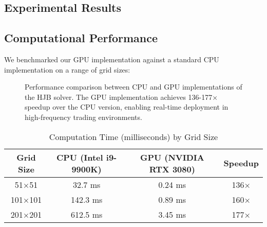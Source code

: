 \documentclass[onecolumn,ieee]{arithmaxresearch}
\begin{document}
\begin{onecolumn}
\section{Experimental Results}

\subsection{Computational Performance}

We benchmarked our GPU implementation against a standard CPU implementation on a range of grid sizes:

\begin{figure}[h]
\centering
{}
\caption{Performance comparison between CPU and GPU implementations of the HJB solver. The GPU implementation achieves 136-177× speedup over the CPU version, enabling real-time deployment in high-frequency trading environments.}
\label{fig:performance}
\end{figure}

\begin{table}[h]
\centering
\caption{Computation Time (milliseconds) by Grid Size}
\begin{tabular}{|c|c|c|c|}
\hline
Grid Size & CPU (Intel i9-9900K) & GPU (NVIDIA RTX 3080) & Speedup \\
\hline
51×51 & 32.7 ms & 0.24 ms & 136× \\
101×101 & 142.3 ms & 0.89 ms & 160× \\
201×201 & 612.5 ms & 3.45 ms & 177× \\
\hline
\end{tabular}
\end{table}


\end{onecolumn}
\end{document}

